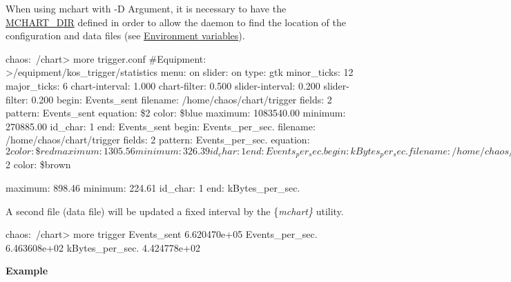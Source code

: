 When using mchart with -\/D Argument, it is necessary to have the \hyperlink{BuildingOptions_BO_MCHART_DIR}{MCHART\_\-DIR} defined in order to allow the daemon to find the location of the configuration and data files (see \hyperlink{BuildingOptions_BO_Environment_variables}{Environment variables}).


\begin{DoxyCode}
chaos:~/chart> more trigger.conf 
#Equipment:            >/equipment/kos_trigger/statistics
menu:                   on
slider:                 on
type:                   gtk
minor_ticks:            12
major_ticks:            6
chart-interval:         1.000
chart-filter:           0.500
slider-interval:        0.200
slider-filter:          0.200
begin:        Events_sent
  filename:     /home/chaos/chart/trigger
  fields:       2
  pattern:      Events_sent
  equation:     \$2
  color:        \$blue
  maximum:      1083540.00
  minimum:      270885.00
  id_char:      1
end:            Events_sent
begin:        Events_per_sec.
  filename:     /home/chaos/chart/trigger
  fields:       2
  pattern:      Events_per_sec.
  equation:     $2
  color:        \$red
  maximum:      1305.56
  minimum:      326.39
  id_char:      1
end:            Events_per_sec.
begin:        kBytes_per_sec.
  filename:     /home/chaos/chart/trigger
  fields:       2
  pattern:      kBytes_per_sec.
  equation:     $2
  color:        \$brown

  maximum:      898.46
  minimum:      224.61
  id_char:      1
end:            kBytes_per_sec.
\end{DoxyCode}


A second file (data file) will be updated a fixed interval by the \{{\itshape mchart\}\/} utility. 
\begin{DoxyCode}
  chaos:~/chart> more trigger
    Events_sent 6.620470e+05
    Events_per_sec. 6.463608e+02
    kBytes_per_sec. 4.424778e+02
\end{DoxyCode}



\begin{DoxyItemize}
\item {\bfseries  Example }
\end{DoxyItemize}


